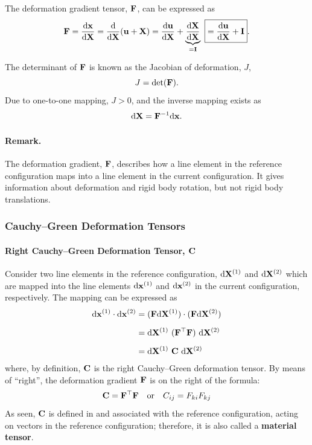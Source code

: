 \documentclass[12pt, a4paper]{article}
\numberwithin{equation}{section}
\begin{document}
The deformation gradient tensor, $\mathbf{F}$, can be expressed as
\begin{equation}
\label{eqn:deform_grad}
    \mathbf{F} 
    = \frac{\mathrm{d} {\bf x}}{\mathrm{d} {\bf X}} 
    = \frac{\mathrm{d}}{\mathrm{d} {\bf X}} (\mathbf{u} + \mathbf{X}) 
    = \frac{\mathrm{d} {\bf u}}{\mathrm{d} {\bf X}} + \underbrace{\frac{\mathrm{d} {\bf X}}{\mathrm{d} {\bf X}}}_{= \mathbf{I}} 
    \ \boxed{= \frac{\mathrm{d} {\bf u}}{\mathrm{d} {\bf X}} + \mathbf{I}}.
\end{equation}

The determinant of $\mathbf{F}$ is known as the Jacobian of deformation, $J$,
\begin{equation}
    J = \det (\mathbf{F}).
\end{equation}
Due to one-to-one mapping, $J>0$, and the inverse mapping exists as 
\begin{equation}
    \mathrm{d}{\bf X} = \mathbf{F}^{-1} \mathrm{d}{\bf x}.
\end{equation}

\paragraph{Remark.} The deformation gradient, $\bf F$, describes how a line element in the reference configuration maps into a line element in the current configuration. It gives information about deformation and rigid body rotation, but not rigid body translations. 

\subsubsection{Cauchy--Green Deformation Tensors}
\paragraph{Right Cauchy--Green Deformation Tensor, $\bf C$} Consider two line elements in the reference configuration, $\mathrm{d} {\bf X}^{(1)}$ and $\mathrm{d} {\bf X}^{(2)}$ which are mapped into the line elements $\mathrm{d} {\bf x}^{(1)}$ and $\mathrm{d} {\bf x}^{(2)}$ in the current configuration, respectively. The mapping can be expressed as
\begin{align}
    \mathrm{d} {\bf x}^{(1)} \cdot \mathrm{d} {\bf x}^{(2)}
    & = (\mathbf{F} \mathrm{d} {\bf X}^{(1)}) \cdot (\mathbf{F} \mathrm{d} {\bf X}^{(2)}) \nonumber \\[.5em]
    & = \mathrm{d} {\bf X}^{(1)} \ (\mathbf{F}^{\top} \mathbf{F}) \ \mathrm{d} {\bf X}^{(2)} \nonumber \\[.5em]
    & = \mathrm{d} {\bf X}^{(1)} \ \mathbf{C} \ \mathrm{d} {\bf X}^{(2)}
\end{align}
where, by definition, $\mathbf{C}$ is the right Cauchy--Green deformation tensor. By means of ``right'', the deformation gradient $\bf F$ is on the right of the formula:
\begin{equation}
    \mathbf{C} = \mathbf{F}^\top  \mathbf{F} \quad \text{or} \quad
    C_{ij} = F_{ki} F_{kj}
\end{equation}
As seen, $\mathbf{C}$ is defined in and associated with the reference configuration, acting on vectors in the reference configuration; therefore, it is also called a \textbf{material tensor}.
\end{document}
